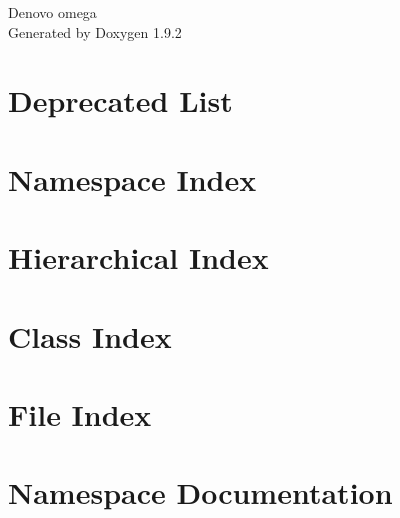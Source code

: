 \documentclass[twoside]{book}
\newcommand{\+}{\discretionary{\mbox{\scriptsize$\hookleftarrow$}}{}{}}
\newcommand{\clearemptydoublepage}{%
    \newpage{\pagestyle{empty}\cleardoublepage}%
  }
\begin{document}
  \raggedbottom
    \hypersetup{pageanchor=false,
                bookmarksnumbered=true,
                pdfencoding=unicode
               }
  \begin{titlepage}
  \vspace*{7cm}
  \begin{center}%
  {\Large Denovo omega}\\
  \vspace*{1cm}
  {\large Generated by Doxygen 1.9.2}\\
  \end{center}
  \end{titlepage}
  \clearemptydoublepage
  \tableofcontents
  \clearemptydoublepage
  \hypersetup{pageanchor=true}
\chapter{Deprecated List}
\label{deprecated}

\chapter{Namespace Index}

\chapter{Hierarchical Index}

\chapter{Class Index}

\chapter{File Index}

\chapter{Namespace Documentation}










\end{document}

